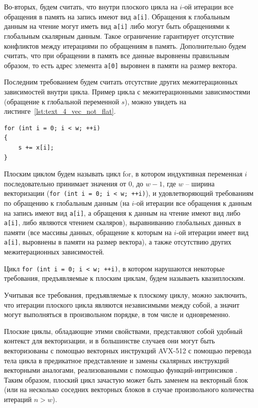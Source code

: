 Во-вторых, будем считать, что внутри плоского цикла на $i$-ой итерации все обращения в память на запись имеют вид \texttt{a[i]}.
Обращения к глобальным данным на чтение могут иметь вид \texttt{a[i]} либо могут быть обращениями к глобальным скалярным данным.
Такое ограничение гарантирует отсутствие конфликтов между итерациями по обращениям в память.
Дополнительно будем считать, что при обращении в память все данные выровнены правильным образом, то есть адрес элемента \texttt{a[0]} выровнен в памяти на размер вектора.

Последним требованием будем считать отсутствие других межитерационных зависимостей внутри цикла.
Пример цикла с межитерационными зависимостями (обращение к глобальной переменной $s$), можно увидеть на листинге~\ref{lst:text_4_vec_not_flat}.

\begin{lstlisting}[caption={Пример цикла с межитерационной зависимостью.},label={lst:text_4_vec_not_flat}]
for (int i = 0; i < w; ++i)
{
   	s += x[i];
}
\end{lstlisting}

\begin{definition}
Плоским циклом будем называть цикл for, в котором индуктивная переменная $i$ последовательно принимает значения от $0$, до $w - 1$, где $w$ -- ширина векторизации (\texttt{for (int i = 0; i < w; ++i)}), и удовлетворяющий требованиям по обращению к глобальным данным (на $i$-ой итерации все обращения к данным на запись имеют вид \texttt{a[i]}, а обращения к данным на чтение имеют вид либо \texttt{a[i]}, либо являются чтением скаляров), выравниванию глобальных данных в памяти (все массивы данных, обращение к которым на $i$-ой итерации имеет вид \texttt{a[i]}, выровнены в памяти на размер вектора), а также отсутствию других межитерационных зависимостей.
\end{definition}

\begin{definition}
Цикл \texttt{for (int i = 0; i < w; ++i)}, в котором нарушаются некоторые требования, предъявляемые к плоским циклам, будем называеть квазиплоским.
\end{definition}

Учитывая все требования, предъявляемые к плоскому циклу, можно заключить, что итерации плоского цикла являются независимыми между собой, а значит могут выполняться в произвольном порядке, в том числе и одновременно.

Плоские циклы, обладающие этими свойствами, представляют собой удобный контекст для векторизации, и в большинстве случаев они могут быть векторизованы с помощью векторных инструкций AVX-512\label{abbr:avx-8} с помощью перевода тела цикла в предикатное представление и замены скалярных инструкций векторными аналогами, реализованными с помощью функций-интринсиков \cite{IntelIntrinsicsGuide,Savin2020VecFlat}.
Таким образом, плоский цикл зачастую может быть заменем на векторный блок (или на несколько соседних векторных блоков в случае произвольного количества итераций $n > w$).

